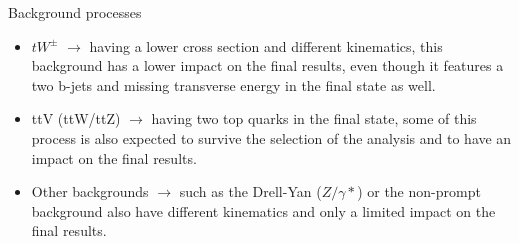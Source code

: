 \documentclass[8 pt]{beamer}
\begin{document}
\begin{frame}{Background processes}
\begin{itemize}
	\item $t W^\pm$ $\rightarrow$ having a lower cross section and different kinematics, this background has a lower impact on the final results, even though it features a two b-jets and missing transverse energy in the final state as well. \\ \vspace{8pt} 
	\item ttV (ttW/ttZ) $\rightarrow$ having two top quarks in the final state, some of this process is also expected to survive the selection of the analysis and to have an impact on the final results. \\ \vspace{8pt} 
	\item Other backgrounds $\rightarrow$ such as the Drell-Yan ($Z/\gamma*$) or the non-prompt background also have different kinematics and only a limited impact on the final results. 
	\end{itemize} \vfill
	
\end{frame}
\end{document}
